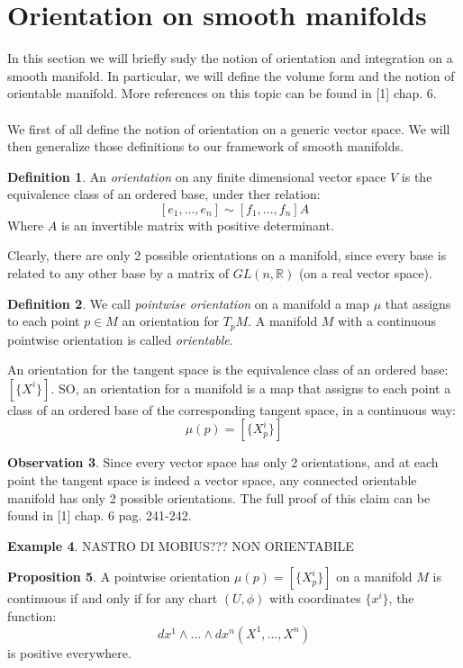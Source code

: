 \documentclass[12pt,a4paper]{report}
\theoremstyle{definition}
\newtheorem{Def}{Definition}[chapter]
\theoremstyle{Theorem}
\newtheorem{Prop}[Def]{Proposition}
\theoremstyle{definition}
\newtheorem{Ex}[Def]{Example}
\theoremstyle{definition}
\newtheorem{Obs}[Def]{Observation}
\begin{document}
	\section{Orientation on smooth manifolds}
	In this section we will briefly sudy the notion of orientation and integration on a smooth manifold. In particular, we will define the volume form and the notion of orientable manifold. More references on this topic can be found in [1] chap. 6.
	\\
	\\
	We first of all define the notion of orientation on a generic vector space. We will then generalize those definitions to our framework of smooth manifolds.
	\begin{Def}
		An \textit{orientation} on any finite dimensional vector space $V$ is the equivalence class of an ordered base, under ther relation:
		$$[e_1,...,e_n]\sim[f_1,...,f_n]A$$
		Where $A$ is an invertible matrix with positive determinant.
	\end{Def}
	Clearly, there are only 2 possible orientations on a manifold, since every base is related to any other base by a matrix of $GL(n,\mathbb{R})$ (on a real vector space).
	\begin{Def}
		We call \textit{pointwise orientation} on a manifold a map $\mu$ that assigns to each point $p\in M$ an orientation for $T_pM$. A manifold $M$ with a continuous pointwise orientation  is called \textit{orientable}.
	\end{Def}
	An orientation for the tangent space is the equivalence class of an ordered base: $[\{X^i\}]$. SO, an orientation for a manifold is a map that assigns to each point a class of an ordered base of the corresponding tangent space, in a continuous way:
	$$\mu(p)=[\{X^i_p\}]$$
	\begin{Obs}
		Since every vector space has only 2 orientations, and at each point the tangent space is indeed a vector space, any connected orientable manifold has only 2 possible orientations. The full proof of this claim can be found in [1] chap. 6 pag. 241-242.
	\end{Obs}
	\begin{Ex}
		NASTRO DI MOBIUS??? NON ORIENTABILE
	\end{Ex}
	\begin{Prop}
		A pointwise orientation $\mu(p)=[\{X^i_p\}]$ on a manifold $M$ is continuous if and only if for any chart $(U,\phi)$ with coordinates $\{x^i\}$, the function:
		$$dx^1\wedge...\wedge dx^n(X^1,...,X^n)$$
		is positive everywhere.
	\end{Prop}
\end{document}
